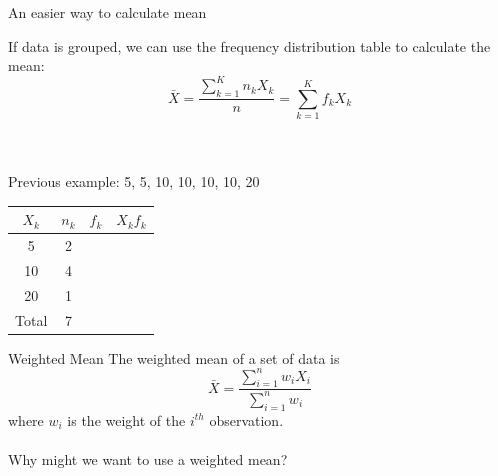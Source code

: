 \documentclass{./../div_teaching_slides}
\begin{document}
\begin{frame}[t]{An easier way to calculate mean}
\vspace{-0.5em}
\begin{witemize}
  \item If data is grouped, we can use the frequency distribution table to calculate the mean: \\ 
$$ \bar{X} = \frac{\sum_{k=1}^K n_k X_k}{n} = \sum_{k=1}^K f_k X_k  $$ \\~\\ \vspace{-0.5em}
  \item Previous example: 5, 5, 10, 10, 10, 10, 20 \\
\end{witemize}
\begin{center}
\begin{tabular}{|c|c|p{1cm}|p{2cm}|}
\hline
$X_k$ & \hspace{0.5em} $n_k$ & \hspace{0.2em} $f_k$ & \hspace{0.2em} $X_k f_k$ \\
\hline
 5 & 2 & & \\
 \hline
10 &  4 & & \\
\hline
20 &  1 & & \\
\hline
Total & 7  & &  \\
\hline 
\end{tabular} 
\end{center}
\vspace{0.5em}

\end{frame}

\begin{frame}{Weighted Mean}
The weighted mean of a set of data is 
$$ \bar{X} = \frac{\sum_{i=1}^nw_i X_i}{\sum_{i=1}^n w_i} $$
where $w_i$ is the weight of the $i^{th}$ observation. \\~\\

Why might we want to use a weighted mean?
\end{frame}
\end{document}
